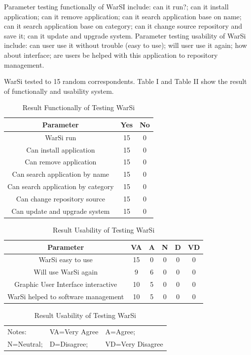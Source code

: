 \documentclass[conference, letterpaper]{IEEEtran}
\begin{document}
Parameter testing functionally of WarSI include: can it run?; can it install application; can it remove application; can it search application base on name; can it search application base on category; can it change source repository and save it; can it update and upgrade system. Parameter testing usability of WarSi include: can user use it without trouble (easy to use); will user use it again; how about interface; are users be helped with this application to repository management. 

WarSi tested to 15 random correspondents. Table I and Table II show the result of functionally and usability system.

\begin{table}[!t]
\renewcommand{\arraystretch}{1.3}
\caption{Result Functionally of Testing WarSi}
\label{table_functional}
\centering
\begin{tabular}{|c|c|c|}
\hline
\textbf{Parameter} & \textbf{Yes} & \textbf{No}\\
\hline
WarSi run & 15 & 0\\
\hline
Can install application & 15 & 0\\
\hline
Can remove application & 15 & 0\\
\hline
Can search application by name & 15 & 0\\
\hline
Can search application by category & 15 & 0\\
\hline
Can change repository source & 15 & 0\\
\hline
Can update and upgrade system & 15 & 0\\
\hline
\end{tabular}
\end{table}

\begin{table}[!t]
\renewcommand{\arraystretch}{1.3}
\caption{Result Usability of Testing WarSi}
\label{table_usability}
\centering
\begin{tabular}{|c|c|c|c|c|c|}
\hline
\textbf{Parameter} & \textbf{VA} & \textbf{A} & \textbf{N} & \textbf{D} & \textbf{VD}\\
\hline
WarSi easy to use & 15 & 0 & 0 & 0 & 0\\
\hline
Will use WarSi again & 9 & 6 & 0 & 0 & 0\\
\hline
Graphic User Interface interactive & 10 & 5 & 0 & 0 & 0\\
\hline
WarSi helped to software management & 10 & 5 & 0 & 0 & 0\\
\hline
\end{tabular}
\begin{tabular}{lll}
Notes: &VA=Very Agree& A=Agree;\\
N=Neutral; &D=Disagree; &VD=Very Disagree\\
\end{tabular}
\end{table}
\end{document}

